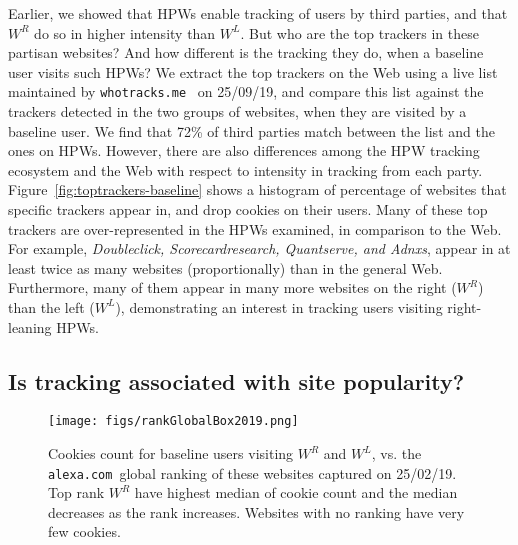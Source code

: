 \documentclass{article}
\newcommand{\hpw}{HPW\xspace}
\newcommand{\hpws}{HPWs\xspace}
\newcommand{\alexa}{\texttt{alexa.com}}
\begin{document}
Earlier, we showed that \hpws enable tracking of users by third parties, and that $W^R$ do so in higher intensity than $W^L$.
But who are the top trackers in these partisan websites?
And how different is the tracking they do, when a baseline user visits such \hpws?
We extract the top trackers on the Web using a live list maintained by \texttt{whotracks.me}~\cite{whotracksme} on 25/09/19, and compare this list against the trackers detected in the two groups of websites, when they are visited by a baseline user.
We find that 72\% of third parties match between the list and the ones on \hpws.
However, there are also differences among the \hpw tracking ecosystem and the Web with respect to intensity in tracking from each party.
Figure~\ref{fig:toptrackers-baseline} shows a histogram of percentage of websites that specific trackers appear in, and drop cookies on their users.
Many of these top trackers are over-represented in the \hpws examined, in comparison to the Web.
For example, \textit{Doubleclick, Scorecardresearch, Quantserve, and Adnxs}, appear in at least twice as many websites (proportionally) than in the general Web.
Furthermore, many of them appear in many more websites on the right ($W^R$) than the left ($W^L$), demonstrating an interest in tracking users visiting right-leaning \hpws.

\subsection{Is tracking associated with site popularity?}\label{sec:popularity-baselines}

\begin{figure}[t]
    \centering
    \texttt{[image: figs/rankGlobalBox2019.png]}
    \caption{Cookies count for baseline users visiting $W^R$ and $W^L$, vs. the \alexa\ global ranking of these websites captured on 25/02/19.
        Top rank $W^R$ have highest median of cookie count and the median decreases as the rank increases.
        Websites with no ranking have very few cookies.} 
    \label{fig:rankBaseRange}
    \vspace{-0.5cm}
\end{figure}
\end{document}
